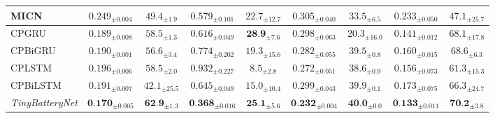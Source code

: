 \begin{table}[t]
\begin{tabular*}{\tblwidth}{@{}LCCCCCCCC@{}}
MICN & $0.249_{\pm 0.004}$ & $49.4_{\pm 1.9}$ & $0.579_{\pm 0.101}$ & $22.7_{\pm 12.7}$ & $0.305_{\pm 0.040}$ & $33.5_{\pm 6.5}$ & $0.233_{\pm 0.050}$ & $47.1_{\pm 25.7}$ \\
\midrule
CPGRU & $0.189_{\pm 0.008}$ & $58.5_{\pm 1.3}$ & $0.616_{\pm 0.049}$ & $\textbf{28.9}_{\pm 7.6}$ & $0.298_{\pm 0.063}$ & $20.3_{\pm 16.0}$ & $0.141_{\pm 0.012}$ & $68.1_{\pm 17.8}$ \\
CPBiGRU & $0.190_{\pm 0.001}$ & $56.6_{\pm 3.4}$ & $0.774_{\pm 0.202}$ & $19.3_{\pm 15.6}$ & $0.282_{\pm 0.055}$ & $39.5_{\pm 0.8}$ & $0.160_{\pm 0.015}$ & $68.6_{\pm 6.3}$ \\
CPLSTM & $0.196_{\pm 0.006}$ & $58.5_{\pm 2.0}$ & $0.932_{\pm 0.227}$ & $8.5_{\pm 2.8}$ & $0.272_{\pm 0.051}$ & $38.6_{\pm 0.9}$ & $0.156_{\pm 0.073}$ & $61.3_{\pm 15.3}$ \\
CPBiLSTM & $0.191_{\pm 0.007}$ & $42.1_{\pm 25.5}$ & $0.645_{\pm 0.049}$ & $15.0_{\pm 10.4}$ & $0.299_{\pm 0.043}$ & $39.9_{\pm 0.1}$ & $0.173_{\pm 0.075}$ & $66.3_{\pm 24.7}$ \\
\midrule
\textit{TinyBatteryNet} & $\textbf{0.170}_{\pm 0.005}$ & $\textbf{62.9}_{\pm 1.3}$ & $\textbf{0.368}_{\pm 0.016}$ & $\textbf{25.1}_{\pm 5.6}$ & $\textbf{0.232}_{\pm 0.004}$ & $\textbf{40.0}_{\pm 0.0}$ & $\textbf{0.133}_{\pm 0.011}$ & $\textbf{70.2}_{\pm 3.8}$ \\
\bottomrule
\end{tabular*}
\end{table}